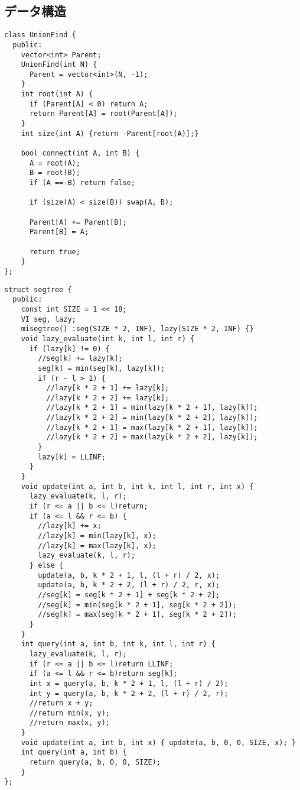 \documentclass{jsarticle}
\begin{document}
\subsection*{データ構造}
\begin{lstlisting}[caption=UnionFind]
class UnionFind {
  public:
    vector<int> Parent;   
    UnionFind(int N) {
      Parent = vector<int>(N, -1);
    }
    int root(int A) {
      if (Parent[A] < 0) return A;
      return Parent[A] = root(Parent[A]);
    }
    int size(int A) {return -Parent[root(A)];}
     
    bool connect(int A, int B) {
      A = root(A);
      B = root(B);
      if (A == B) return false;
     
      if (size(A) < size(B)) swap(A, B);
     
      Parent[A] += Parent[B];
      Parent[B] = A;
     
      return true;
    }
};
\end{lstlisting}
\begin{lstlisting}[caption=セグ木]
struct segtree {
  public:
    const int SIZE = 1 << 18;
    VI seg, lazy;
    misegtree() :seg(SIZE * 2, INF), lazy(SIZE * 2, INF) {}
    void lazy_evaluate(int k, int l, int r) {
      if (lazy[k] != 0) {
        //seg[k] += lazy[k];
        seg[k] = min(seg[k], lazy[k]);
        if (r - l > 1) {
          //lazy[k * 2 + 1] += lazy[k];
          //lazy[k * 2 + 2] += lazy[k];
          //lazy[k * 2 + 1] = min(lazy[k * 2 + 1], lazy[k]);
          //lazy[k * 2 + 2] = min(lazy[k * 2 + 2], lazy[k]);
          //lazy[k * 2 + 1] = max(lazy[k * 2 + 1], lazy[k]);
          //lazy[k * 2 + 2] = max(lazy[k * 2 + 2], lazy[k]);
        }
        lazy[k] = LLINF;
      }
    }
    void update(int a, int b, int k, int l, int r, int x) {
      lazy_evaluate(k, l, r);
      if (r <= a || b <= l)return;
      if (a <= l && r <= b) {
        //lazy[k] += x;
        //lazy[k] = min(lazy[k], x);
        //lazy[k] = max(lazy[k], x);
        lazy_evaluate(k, l, r);
      } else {
        update(a, b, k * 2 + 1, l, (l + r) / 2, x);
        update(a, b, k * 2 + 2, (l + r) / 2, r, x);
        //seg[k] = seg[k * 2 + 1] + seg[k * 2 + 2];
        //seg[k] = min(seg[k * 2 + 1], seg[k * 2 + 2]);
        //seg[k] = max(seg[k * 2 + 1], seg[k * 2 + 2]);
      }
    }
    int query(int a, int b, int k, int l, int r) {
      lazy_evaluate(k, l, r);
      if (r <= a || b <= l)return LLINF;
      if (a <= l && r <= b)return seg[k];
      int x = query(a, b, k * 2 + 1, l, (l + r) / 2);
      int y = query(a, b, k * 2 + 2, (l + r) / 2, r);
      //return x + y;
      //return min(x, y);
      //return max(x, y);
    }
    void update(int a, int b, int x) { update(a, b, 0, 0, SIZE, x); }
    int query(int a, int b) {
      return query(a, b, 0, 0, SIZE);
    }
};
\end{lstlisting}
\end{document}
